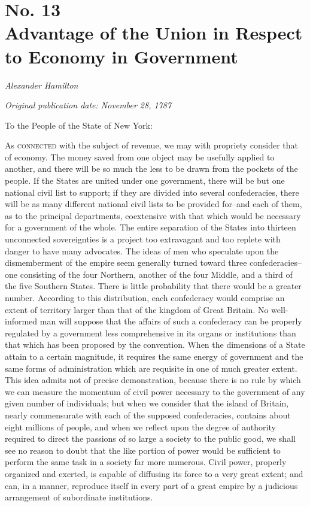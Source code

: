\chapter[No. 13: Advantage of the Union in Respect to Economy in Government]{No. 13\\ {\small Advantage of the Union in Respect to Economy in Government}}

\textit{Alexander Hamilton}

\textit{Original publication date: November 28, 1787}
\vspace{1cm}

To the People of the State of New York:
\vspace{.4cm}

As \textsc{connected} with the subject of revenue, we may with propriety consider that of economy. 
The money saved from one object may be usefully applied to another, and there will be so much the less to be drawn from the pockets of the people. 
If the States are united under one government, there will be but one national civil list to support; if they are divided into several confederacies, there will be as many different national civil lists to be provided for--and each of them, as to the principal departments, coextensive with that which would be necessary for a government of the whole. 
The entire separation of the States into thirteen unconnected sovereignties is a project too extravagant and too replete with danger to have many advocates. 
The ideas of men who speculate upon the dismemberment of the empire seem generally turned toward three confederacies--one consisting of the four Northern, another of the four Middle, and a third of the five Southern States. 
There is little probability that there would be a greater number. 
According to this distribution, each confederacy would comprise an extent of territory larger than that of the kingdom of Great Britain. 
No well-informed man will suppose that the affairs of such a confederacy can be properly regulated by a government less comprehensive in its organs or institutions than that which has been proposed by the convention. 
When the dimensions of a State attain to a certain magnitude, it requires the same energy of government and the same forms of administration which are requisite in one of much greater extent. 
This idea admits not of precise demonstration, because there is no rule by which we can measure the momentum of civil power necessary to the government of any given number of individuals; but when we consider that the island of Britain, nearly commensurate with each of the supposed confederacies, contains about eight millions of people, and when we reflect upon the degree of authority required to direct the passions of so large a society to the public good, we shall see no reason to doubt that the like portion of power would be sufficient to perform the same task in a society far more numerous. 
Civil power, properly organized and exerted, is capable of diffusing its force to a very great extent; and can, in a manner, reproduce itself in every part of a great empire by a judicious arrangement of subordinate institutions.

